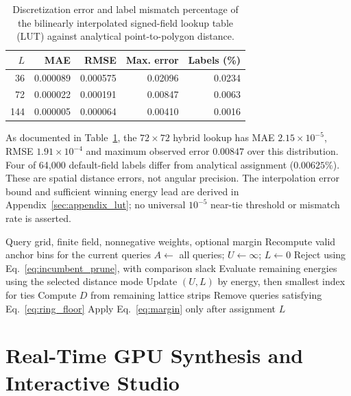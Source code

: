 \documentclass[sigconf,nonacm]{acmart}
\begin{document}
\begin{table}[h]
\centering\small
\caption{Discretization error and label mismatch percentage of the bilinearly
interpolated signed-field lookup table (LUT) against analytical point-to-polygon distance.}
\label{tbl:lut_err}
\setlength{\tabcolsep}{3pt}
\begin{tabular}{rrrrr}\toprule
$L$ & MAE & RMSE & Max. error & Labels (\%) \\ \midrule
36 & 0.000089 & 0.000575 & 0.02096 & 0.0234 \\
72 & 0.000022 & 0.000191 & 0.00847 & 0.0063 \\
144 & 0.000005 & 0.000064 & 0.00410 & 0.0016 \\
\bottomrule\end{tabular}
\end{table}

As documented in Table~\ref{tbl:lut_err}, the $72\times72$ hybrid lookup has
MAE $2.15\times10^{-5}$, RMSE $1.91\times10^{-4}$ and maximum observed error
$0.00847$ over this distribution. Four of 64,000 default-field labels differ
from analytical assignment ($0.00625\%$). These are spatial distance errors,
not angular precision. The interpolation error bound and sufficient winning
energy lead are derived in Appendix~\ref{sec:appendix_lut}; no universal
$10^{-5}$ near-tie threshold or mismatch rate is asserted.

\begin{algorithm}[t]
\caption{Adaptive Binned MORONI Renderer}
\label{alg:main}
\begin{algorithmic}[1]
\Require Query grid, finite field, nonnegative weights, optional margin
\State Recompute valid anchor bins for the current queries
\State $A\gets$ all queries; $U\gets\infty$; $L\gets0$
    \State Reject using Eq.~\ref{eq:incumbent_prune}, with comparison slack
    \State Evaluate remaining energies using the selected distance mode
    \State Update $(U,L)$ by energy, then smallest index for ties
  \EndFor
  \State Compute $D$ from remaining lattice strips
  \State Remove queries satisfying Eq.~\ref{eq:ring_floor}
\EndFor
\State Apply Eq.~\ref{eq:margin} only after assignment
\State \Return $L$
\end{algorithmic}
\end{algorithm}

\section{Real-Time GPU Synthesis and Interactive Studio}
\label{sec:app}
\end{document}
